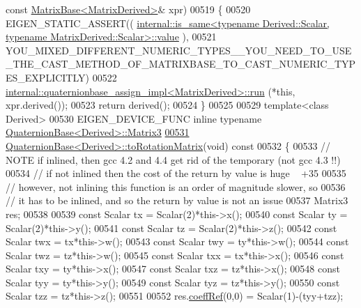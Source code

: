 \begin{DoxyCode}
{      const} \hyperlink{group___core___module_class_eigen_1_1_matrix_base}{MatrixBase<MatrixDerived>}& xpr)
00519 \{
00520   EIGEN\_STATIC\_ASSERT((
      \hyperlink{struct_eigen_1_1internal_1_1is__same}{internal::is\_same<typename Derived::Scalar, typename MatrixDerived::Scalar>::value}
      ),
00521    
      YOU\_MIXED\_DIFFERENT\_NUMERIC\_TYPES\_\_YOU\_NEED\_TO\_USE\_THE\_CAST\_METHOD\_OF\_MATRIXBASE\_TO\_CAST\_NUMERIC\_TYPES\_EXPLICITLY)
00522   \hyperlink{struct_eigen_1_1internal_1_1quaternionbase__assign__impl}{internal::quaternionbase\_assign\_impl<MatrixDerived>::run}
      (*\textcolor{keyword}{this}, xpr.derived());
00523   \textcolor{keywordflow}{return} derived();
00524 \}
00525 
00529 \textcolor{keyword}{template}<\textcolor{keyword}{class} Derived>
00530 EIGEN\_DEVICE\_FUNC \textcolor{keyword}{inline} \textcolor{keyword}{typename} \hyperlink{group___core___module_class_eigen_1_1_matrix}{QuaternionBase<Derived>::Matrix3}
\hyperlink{group___geometry___module_a621c71eec9680bf77342b28a473b6874}{00531} \hyperlink{group___geometry___module_a621c71eec9680bf77342b28a473b6874}{QuaternionBase<Derived>::toRotationMatrix}(\textcolor{keywordtype}{void})\textcolor{keyword}{ const}
00532 \textcolor{keyword}{}\{
00533   \textcolor{comment}{// NOTE if inlined, then gcc 4.2 and 4.4 get rid of the temporary (not gcc 4.3 !!)}
00534   \textcolor{comment}{// if not inlined then the cost of the return by value is huge ~ +35%
00535   \textcolor{comment}{// however, not inlining this function is an order of magnitude slower, so}
00536   \textcolor{comment}{// it has to be inlined, and so the return by value is not an issue}
00537   Matrix3 res;
00538 
00539   \textcolor{keyword}{const} Scalar tx  = Scalar(2)*this->x();
00540   \textcolor{keyword}{const} Scalar ty  = Scalar(2)*this->y();
00541   \textcolor{keyword}{const} Scalar tz  = Scalar(2)*this->z();
00542   \textcolor{keyword}{const} Scalar twx = tx*this->w();
00543   \textcolor{keyword}{const} Scalar twy = ty*this->w();
00544   \textcolor{keyword}{const} Scalar twz = tz*this->w();
00545   \textcolor{keyword}{const} Scalar txx = tx*this->x();
00546   \textcolor{keyword}{const} Scalar txy = ty*this->x();
00547   \textcolor{keyword}{const} Scalar txz = tz*this->x();
00548   \textcolor{keyword}{const} Scalar tyy = ty*this->y();
00549   \textcolor{keyword}{const} Scalar tyz = tz*this->y();
00550   \textcolor{keyword}{const} Scalar tzz = tz*this->z();
00551 
00552   res.\hyperlink{class_eigen_1_1_plain_object_base_a25626a55b26a4323565f79d1b7c48ea8}{coeffRef}(0,0) = Scalar(1)-(tyy+tzz);
}
\end{DoxyCode}
